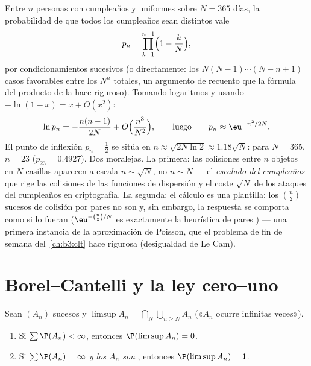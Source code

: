 \begin{example}
\label{ex:b3:probability:birthday}
Entre $n$ personas con cumpleaños
 y uniformes
sobre $N = 365$ días, la probabilidad de que todos los cumpleaños sean
distintos vale
\[
p_n = \prod_{k=1}^{n-1}\Bigl(1 - \frac kN\Bigr),
\]
por condicionamientos sucesivos (o directamente: los
$N(N-1)\cdots(N - n + 1)$ casos favorables entre los $N^n$ totales, un
argumento de recuento que la fórmula del producto de la
 hace riguroso).
Tomando logaritmos y usando $-\ln(1 - x) = x +
O(x^2)$:
\[
\ln p_n = -\frac{n(n-1)}{2N} +
O\Bigl(\frac{n^3}{N^2}\Bigr),
\qquad\text{luego}\qquad
p_n \approx \eu^{-n^2/2N} .
\]
El punto de inflexión $p_n = \frac12$ se sitúa en $n \approx
\sqrt{2N\ln2} \approx 1.18\sqrt N$: para $N = 365$, $n = 23$
($p_{23} = 0.4927$). Dos moralejas. La primera: las colisiones entre $n$
objetos en $N$ casillas aparecen a escala $n \sim \sqrt N$, no
$n \sim N$ --- el \emph{escalado del cumpleaños} que rige las colisiones
de las funciones de dispersión y el coste $\sqrt N$ de los ataques del
cumpleaños en criptografía. La segunda: el cálculo es una plantilla: los
$\binom n2$ sucesos de colisión por pares no son
 y, sin embargo,
la respuesta se comporta como si lo fueran ($\eu^{-\binom n2/N}$ es
exactamente la heurística de pares ) --- una primera
instancia de la aproximación de Poisson, que el problema de fin de
semana del~\cref{ch:b3:clt} hace rigurosa (desigualdad de Le Cam).
\end{example}

\section{Borel--Cantelli y la ley cero--uno}

\begin{theorem}
\label{thm:b3:probability:borelcantelli}
Sean $(A_n)$ sucesos y $\limsup A_n = \bigcap_N
\bigcup_{n\geq N}A_n$ («$A_n$ ocurre infinitas veces»).
\begin{enumerate}
  \item Si $\sum\P(A_n) < \infty$, entonces $\P(\limsup A_n) =
        0$. \item Si $\sum\P(A_n) = \infty$ \emph{y los $A_n$ son
  }, entonces
  $\P(\limsup A_n) = 1$.
\end{enumerate}
\end{theorem}

